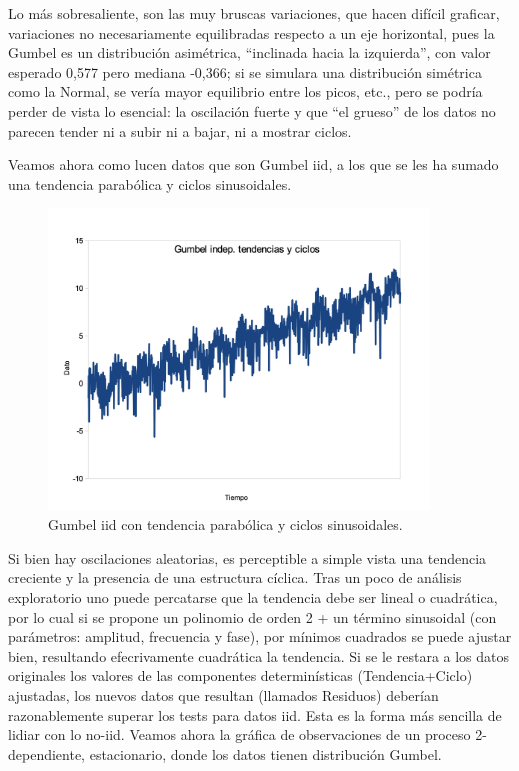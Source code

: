 \documentclass[
  oneside]{book}
\begin{document}
Lo más sobresaliente, son las muy bruscas variaciones, que hacen difícil
graficar, variaciones no necesariamente equilibradas respecto a un eje
horizontal, pues la Gumbel es un distribución asimétrica, ``inclinada
hacia la izquierda'', con valor esperado 0,577 pero mediana -0,366; si
se simulara una distribución simétrica como la Normal, se vería mayor
equilibrio entre los picos, etc., pero se podría perder de vista lo
esencial: la oscilación fuerte y que ``el grueso'' de los datos no
parecen tender ni a subir ni a bajar, ni a mostrar ciclos.

Veamos ahora como lucen datos que son Gumbel iid, a los que se les ha
sumado una tendencia parabólica y ciclos sinusoidales.

\begin{figure}
\centering
\includegraphics[width=0.9\textwidth,height=\textheight]{images/p2.png}
\caption{Gumbel iid con tendencia parabólica y ciclos sinusoidales.}
\end{figure}

Si bien hay oscilaciones aleatorias, es perceptible a simple vista una
tendencia creciente y la presencia de una estructura cíclica. Tras un
poco de análisis exploratorio uno puede percatarse que la tendencia debe
ser lineal o cuadrática, por lo cual si se propone un polinomio de orden
2 + un término sinusoidal (con parámetros: amplitud, frecuencia y fase),
por mínimos cuadrados se puede ajustar bien, resultando efecrivamente
cuadrática la tendencia. Si se le restara a los datos originales los
valores de las componentes determinísticas (Tendencia+Ciclo) ajustadas,
los nuevos datos que resultan (llamados Residuos) deberían
razonablemente superar los tests para datos iid. Esta es la forma más
sencilla de lidiar con lo no-iid. Veamos ahora la gráfica de
observaciones de un proceso 2-dependiente, estacionario, donde los datos
tienen distribución Gumbel.
\end{document}
